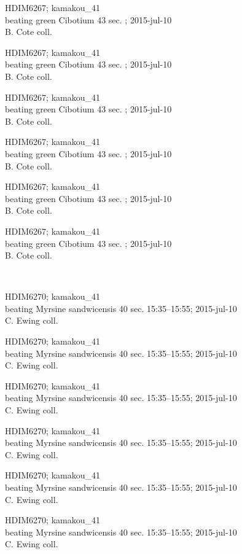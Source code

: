\documentclass[2pt]{extarticle}
\begin{document}
\noindent
\parbox{0.16\textwidth}{\tiny \raggedright \rule[-0.3\baselineskip]{0pt}{10pt}HDIM6267; kamakou\_41\\ beating green Cibotium 43 sec. ; 2015-jul-10\\ B. Cote coll.}
\parbox{0.16\textwidth}{\tiny \raggedright \rule[-0.3\baselineskip]{0pt}{10pt}HDIM6267; kamakou\_41\\ beating green Cibotium 43 sec. ; 2015-jul-10\\ B. Cote coll.}
\parbox{0.16\textwidth}{\tiny \raggedright \rule[-0.3\baselineskip]{0pt}{10pt}HDIM6267; kamakou\_41\\ beating green Cibotium 43 sec. ; 2015-jul-10\\ B. Cote coll.}
\parbox{0.16\textwidth}{\tiny \raggedright \rule[-0.3\baselineskip]{0pt}{10pt}HDIM6267; kamakou\_41\\ beating green Cibotium 43 sec. ; 2015-jul-10\\ B. Cote coll.}
\parbox{0.16\textwidth}{\tiny \raggedright \rule[-0.3\baselineskip]{0pt}{10pt}HDIM6267; kamakou\_41\\ beating green Cibotium 43 sec. ; 2015-jul-10\\ B. Cote coll.}
\parbox{0.16\textwidth}{\tiny \raggedright \rule[-0.3\baselineskip]{0pt}{10pt}HDIM6267; kamakou\_41\\ beating green Cibotium 43 sec. ; 2015-jul-10\\ B. Cote coll.} \\ 
\vspace{0.001in} 

\noindent
\parbox{0.16\textwidth}{\tiny \raggedright \rule[-0.3\baselineskip]{0pt}{10pt}HDIM6270; kamakou\_41\\ beating Myrsine sandwicensis 40 sec. 15:35--15:55; 2015-jul-10\\ C. Ewing coll.}
\parbox{0.16\textwidth}{\tiny \raggedright \rule[-0.3\baselineskip]{0pt}{10pt}HDIM6270; kamakou\_41\\ beating Myrsine sandwicensis 40 sec. 15:35--15:55; 2015-jul-10\\ C. Ewing coll.}
\parbox{0.16\textwidth}{\tiny \raggedright \rule[-0.3\baselineskip]{0pt}{10pt}HDIM6270; kamakou\_41\\ beating Myrsine sandwicensis 40 sec. 15:35--15:55; 2015-jul-10\\ C. Ewing coll.}
\parbox{0.16\textwidth}{\tiny \raggedright \rule[-0.3\baselineskip]{0pt}{10pt}HDIM6270; kamakou\_41\\ beating Myrsine sandwicensis 40 sec. 15:35--15:55; 2015-jul-10\\ C. Ewing coll.}
\parbox{0.16\textwidth}{\tiny \raggedright \rule[-0.3\baselineskip]{0pt}{10pt}HDIM6270; kamakou\_41\\ beating Myrsine sandwicensis 40 sec. 15:35--15:55; 2015-jul-10\\ C. Ewing coll.}
\parbox{0.16\textwidth}{\tiny \raggedright \rule[-0.3\baselineskip]{0pt}{10pt}HDIM6270; kamakou\_41\\ beating Myrsine sandwicensis 40 sec. 15:35--15:55; 2015-jul-10\\ C. Ewing coll.} \\ 
\vspace{0.001in} 
\end{document}
